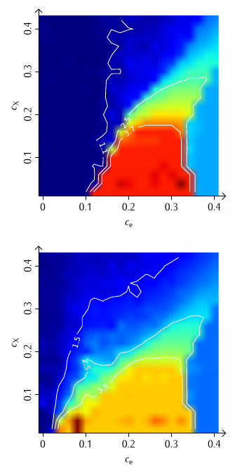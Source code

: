 \documentclass[a4paper, 10pt, twoside, openany]{book} %
\begin{document}
\begin{figure}
\begin{minipage}[t]{0.48\textwidth}
        \label{H_penalty_random_D}
    \end{minipage}
    \begin{minipage}[t]{0.48\textwidth}
        \includegraphics[width=\textwidth]{Abbildungen/Phasendiagramme/Konturen/H_individual_D.pdf}
        \label{H_individual_D}
    \end{minipage}
    \hfill
    \begin{minipage}[t]{0.48\textwidth}
        \includegraphics[width=\textwidth]{Abbildungen/Phasendiagramme/Konturen/H_penalty_individual_D.pdf}

\end{minipage}
\end{figure}
\end{document}
